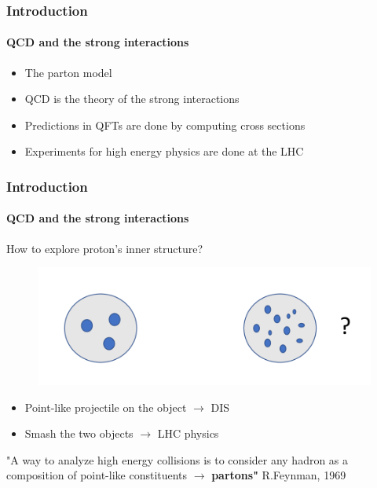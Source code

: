 \documentclass[aspectratio=43]{beamer}
\begin{document}
\begin{frame}

	\frametitle{Introduction}
	\framesubtitle{QCD and the strong interactions}
	
	\begin{itemize}
		\item \footnotesize The parton model
		\item \footnotesize QCD is the theory of the strong interactions
		\item \footnotesize Predictions in QFTs are done by computing cross sections
		\item \footnotesize Experiments for high energy physics are done at the LHC
	\end{itemize}

\end{frame}

\begin{frame}

	\frametitle{Introduction}
	\framesubtitle{QCD and the strong interactions}
	
	How to explore proton's inner structure?

	\begin{figure}
		\includegraphics[width = 0.5\linewidth]{plots/part1/intro/protons.png}
	\end{figure}
	
	
	\begin{itemize}
		\item \footnotesize Point-like projectile on the object $\longrightarrow$ DIS
		\item \footnotesize Smash the two objects $\longrightarrow$ LHC physics
	\end{itemize}
	
	{\color{blue} \footnotesize "A way to analyze high energy collisions is to consider any hadron as a composition of point-like constituents $\longrightarrow$ \textbf{partons"} } R.Feynman, 1969 

\end{frame}
\end{document}
